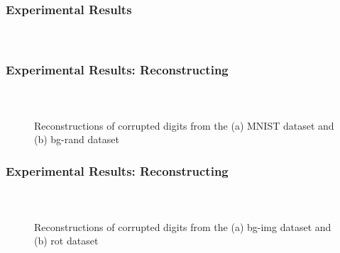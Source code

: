 
\begin{frame}[t]
	\frametitle{Experimental Results}
	\framesubtitle{~~}  %

\end{frame}


\begin{frame}[t]
	\frametitle{Experimental Results: Reconstructing}
	\framesubtitle{~~}  %

\begin{figure}
  \centering
  \caption{Reconstructions of corrupted digits from the (a) MNIST dataset and  (b) bg-rand dataset}
  \label{fig:reconstruct}
\end{figure}

\end{frame}


\begin{frame}[t]
	\frametitle{Experimental Results: Reconstructing}
	\framesubtitle{~~}  %

\begin{figure}
  \centering
  \caption{Reconstructions of corrupted digits from the (a) bg-img dataset and (b) rot dataset}
  \label{fig:reconstruct}
\end{figure}

\end{frame}

